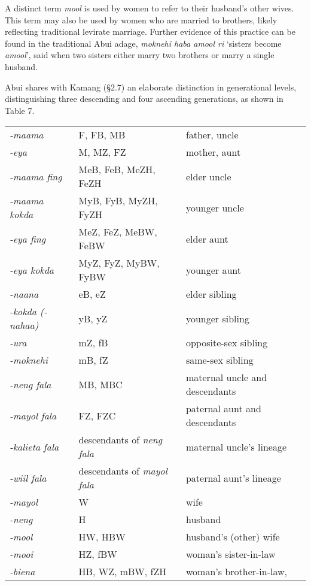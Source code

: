 A distinct term \textit{mool} is used by women to refer to their husband's other wives. This term may also be used by women who are married to brothers, likely reflecting traditional levirate marriage. Further evidence of this practice can be found in the traditional Abui adage, \textit{moknehi haba amool ri} `sisters become \textit{amool}', said when two sisters either marry two brothers or marry a single husband.

Abui shares with Kamang ({\S}2.7) an elaborate distinction in generational levels, distinguishing three descending and four ascending generations, as shown in Table 7.



\begin{table}


\begin{tabular}{p{3cm}p{3cm}p{5cm}}
\textit{{}-maama} & F, FB, MB & father, uncle\\
\textit{{}-eya} & M, MZ, FZ & mother, aunt\\
\textit{{}-maama fing} & MeB, FeB, MeZH, FeZH & elder uncle\\
\textit{{}-maama kokda} & MyB, FyB, MyZH, FyZH & younger uncle\\
\textit{{}-eya fing} & MeZ, FeZ, MeBW, FeBW & elder aunt\\
\textit{{}-eya kokda} & MyZ, FyZ, MyBW, FyBW & younger aunt\\
\textit{{}-naana} & eB, eZ & elder sibling\\
\textit{{}-kokda (-nahaa)} & yB, yZ & younger sibling\\
\textit{{}-ura} & mZ, fB & opposite-sex sibling\\
\textit{{}-moknehi} & mB, fZ & same-sex sibling\\
\textit{{}-neng fala} & MB, MBC & maternal uncle and descendants\\
\textit{{}-mayol fala} & FZ, FZC & paternal aunt and descendants\\
\textit{{}-kalieta fala} & descendants of \textit{neng fala} & maternal uncle's lineage\\
\textit{{}-wiil fala} & descendants of \textit{mayol fala} & paternal aunt's lineage\\
\textit{{}-mayol} & W & wife\\
\textit{{}-neng} & H & husband\\
\textit{{}-mool} & HW, HBW & husband's (other) wife\\
\textit{{}-mooi} & HZ, fBW & woman's sister-in-law\\
\textit{{}-biena} & HB, WZ, mBW, fZH & woman's brother-in-law,


\end{tabular}
\end{table}
